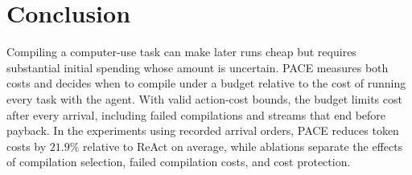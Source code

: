 \section{Conclusion}
\label{sec:conclusion}

Compiling a computer-use task can make later runs cheap but requires substantial initial spending whose amount is uncertain.
PACE measures both costs and decides when to compile under a budget relative to the cost of running every task with the agent.
With valid action-cost bounds, the budget limits cost after every arrival, including failed compilations and streams that end before payback.
In the experiments using recorded arrival orders, PACE reduces token costs by $21.9\%$ relative to ReAct on average, while ablations separate the effects of compilation selection, failed compilation costs, and cost protection.
